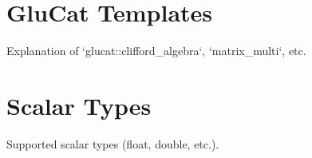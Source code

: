 \section{GluCat Templates}
Explanation of `glucat::clifford_algebra`, `matrix_multi`, etc.

\section{Scalar Types}
Supported scalar types (float, double, etc.).
